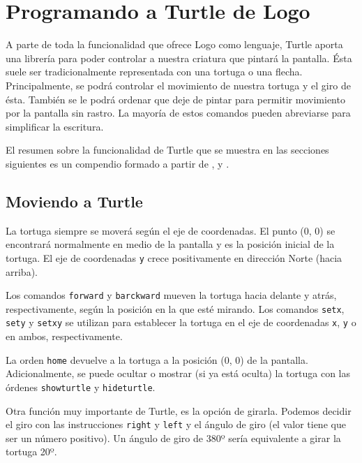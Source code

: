 

\chapter{Programando a Turtle de Logo}
\label{anexo:logo-turtle-lenguaje}

A parte de toda la funcionalidad que ofrece Logo como lenguaje, Turtle aporta una librería para poder controlar a nuestra criatura que pintará la pantalla. Ésta suele ser tradicionalmente representada con una tortuga o una flecha. Principalmente, se podrá controlar el movimiento de nuestra tortuga y el giro de ésta. También se le podrá ordenar que deje de pintar para permitir movimiento por la pantalla sin rastro. La mayoría de estos comandos pueden abreviarse para simplificar la escritura.

El resumen sobre la funcionalidad de Turtle que se muestra en las secciones siguientes es un compendio formado a partir de \cite{logo-turtle-lenguaje}, \cite{turtle-academy} y \cite{abelson1980disessa}.


\section*{Moviendo a Turtle}

La tortuga siempre se moverá según el eje de coordenadas. El punto (0, 0) se encontrará normalmente en medio de la pantalla y es la posición inicial de la tortuga. El eje de coordenadas \texttt{y} crece positivamente en dirección Norte (hacia arriba).

Los comandos \texttt{forward} y \texttt{barckward} mueven la tortuga hacia delante y atrás, respectivamente, según la posición en la que esté mirando. Los comandos \texttt{setx}, \texttt{sety} y \texttt{setxy} se utilizan para establecer la tortuga en el eje de coordenadas \texttt{x}, \texttt{y} o en ambos, respectivamente.

La orden \texttt{home} devuelve a la tortuga a la posición (0, 0) de la pantalla. Adicionalmente, se puede ocultar o mostrar (si ya está oculta) la tortuga con las órdenes \texttt{showturtle} y \texttt{hideturtle}.

Otra función muy importante de Turtle, es la opción de girarla. Podemos decidir el giro con las instrucciones \texttt{right} y \texttt{left} y el ángulo de giro (el valor tiene que ser un número positivo). Un ángulo de giro de 380º sería equivalente a girar la tortuga 20º.


